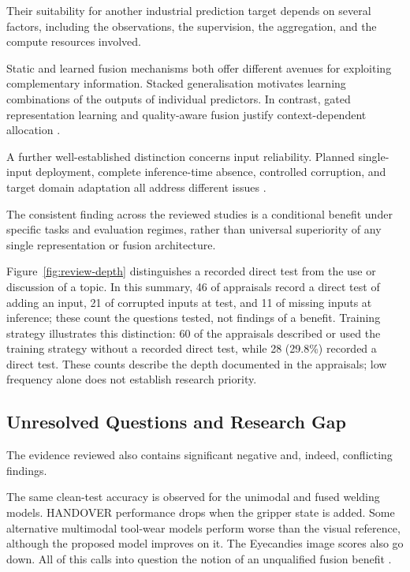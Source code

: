 Their suitability for another industrial prediction target depends on several
factors, including the observations, the supervision, the aggregation, and the compute resources
involved.

Static and learned fusion mechanisms both offer different avenues for exploiting complementary
information. Stacked generalisation motivates learning combinations of the outputs of individual
predictors. In contrast, gated representation learning and quality-aware fusion justify
context-dependent allocation \parencite{Ting1999Issues,P006,Zhang2023QMF}.

A further well-established distinction concerns input reliability. Planned single-input deployment,
complete inference-time absence, controlled corruption, and target domain adaptation all address
different issues \parencite{Li2025PGMTKD,Altinses2023Fuzzy,P051}.

The consistent finding across the reviewed studies is a conditional benefit under specific tasks and
evaluation regimes, rather than universal superiority of any single representation or fusion
architecture.

Figure~\ref{fig:review-depth} distinguishes a recorded direct test from the use or discussion of a
topic. In this summary, 46 of \ReviewWorkCount{} appraisals record a direct test of adding an input, 21 of
corrupted inputs at test, and 11 of missing inputs at inference; these count the
questions tested, not findings of a benefit.
Training strategy illustrates this distinction: 60 of the \ReviewWorkCount{} appraisals described or used the
training strategy without a recorded direct test, while 28 (29.8\%) recorded a direct test. These
counts describe the depth documented in the appraisals; low frequency alone does not establish
research priority.

\ReviewDepthFigure

\subsection{Unresolved Questions and Research Gap}

The evidence reviewed also contains significant negative and, indeed, conflicting findings.

The same clean-test accuracy is observed for the unimodal and fused welding models. HANDOVER
performance drops when the gripper state is added. Some alternative multimodal tool-wear models
perform worse than the visual reference, although the proposed model improves on it. The Eyecandies
image scores also go down. All of this calls into question the notion of an unqualified fusion
benefit \parencite{Hua2026Weld,Thoduka2024Handover,P045,P033}.

